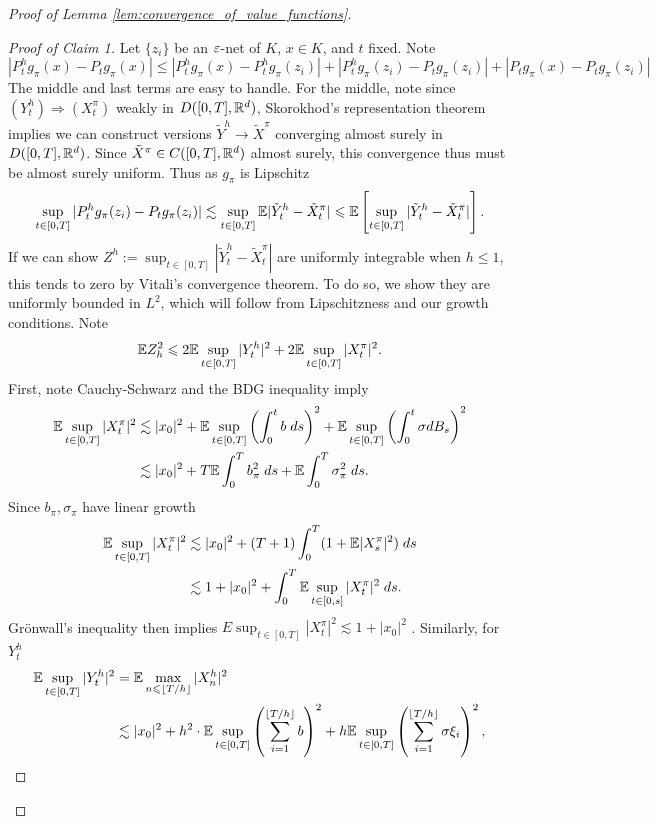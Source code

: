 \begin{proof}[Proof of Lemma \ref{lem:convergence_of_value_functions}]
	\begin{proof}[Proof of Claim 1]
		Let $\{z_i\}$ be an $\varepsilon$-net of $K$, $x \in K$, and $t$ fixed.  Note
		\[|P_t^h g_\pi(x) - P_t g_\pi(x)| \leq |P_t^h g_\pi(x) - P_t^h g_\pi(z_i)| + |P_t^h g_\pi(z_i) - P_t g_\pi(z_i)| + |P_t g_\pi(x) - P_t g_\pi(z_i)|\]
		\noindent The middle and last terms are easy to handle. For the middle, note since $(Y^h_t) \Rightarrow (X^\pi_t)$ weakly in $D([0,T], \mathbb{R}^d)$,
		Skorokhod's representation theorem implies we can construct versions $\tilde{Y}^h \to \tilde{X}^\pi$ converging almost surely in $D([0,T], \mathbb{R}^d)$. Since $\tilde{X}^\pi \in C([0,T], \mathbb{R}^d)$ almost
		surely, this convergence thus must be almost surely uniform. Thus as $g_\pi$ is Lipschitz
		\[\sup_{t \in [0,T]}|P_t^h g_\pi(z_i) - P_t g_\pi(z_i)| \lesssim \sup_{t\in [0,T]} \mathbb{E} |\tilde{Y}^h_t - \tilde{X}^\pi_t| \leqslant   \mathbb{E} \left[ \sup_{t\in [0,T]}|\tilde{Y}^h_t - \tilde{X}^\pi_t| \right].\]
		\noindent If we can show $Z^h := \sup_{t \in [0,T]} |\tilde{Y}^h_t - \tilde{X}^\pi_t|$ are uniformly integrable when $h \leq 1$, this tends to zero by Vitali's convergence theorem.
		 To do so, we show they are uniformly bounded in $L^2$, which will follow from Lipschitzness and our growth conditions. Note
		\[\mathbb{E} Z_h^2 \leqslant 2\mathbb{E} \sup_{t \in [0,T]} |Y^h_t|^2 + 2\mathbb{E} \sup_{t \in [0,T]} |X_t^\pi|^2.\]
		\noindent First, note Cauchy-Schwarz and the BDG inequality imply
		\begin{align*}
			\mathbb{E} \sup_{t \in [0,T]} |X_t^\pi|^2 & \lesssim |x_0|^2 + \mathbb{E} \sup_{t \in [0,T]} \left(\int_0^t b \; ds\right)^2 + \mathbb{E} \sup_{t \in [0,T]} \left(\int_0^t \sigma dB_s\right)^2\\
			& \lesssim |x_0|^2 + T \mathbb{E} \int_0^T b_\pi^2 \; ds + \mathbb{E} \int_0^T \sigma_\pi^2 \; ds.
		\end{align*}
		\noindent Since $b_\pi, \sigma_\pi$ have linear growth
		\begin{align*}
			\mathbb{E} \sup_{t \in [0,T]} |X_t^\pi|^2 & \lesssim |x_0|^2 + (T + 1) \int_0^T (1 + \mathbb{E} |X^\pi_s|^2)\; ds\\
			& \lesssim 1 + |x_0|^2 + \int_0^T \mathbb{E} \sup_{t\in [0,s]} |X^\pi_t|^2 \; ds.
		\end{align*}
		\noindent Gr\"onwall's inequality then implies $E \sup_{t \in [0,T]} |X^\pi_t|^2 \lesssim 1 + |x_0|^2$ . Similarly, for $Y^h_t$
		\begin{align*}
			\E \sup_{t \in [0,T]} |Y^h_t|^2 & = \E\max_{n \leq \lfloor T/ h\rfloor} |X_n^h|^2 \\
			& \lesssim |x_0|^2 + h^2 \cdot \E \sup_{t \in [0,T]}   \left(\sum_{i=1}^{\lfloor T/h \rfloor} b\right)^2 + h \E \sup_{t \in [0,T]} \left(\sum_{i=1}^{\lfloor T/h \rfloor} \sigma \xi_i\right)^2,\\

\end{align*}
\end{proof}
\end{proof}
